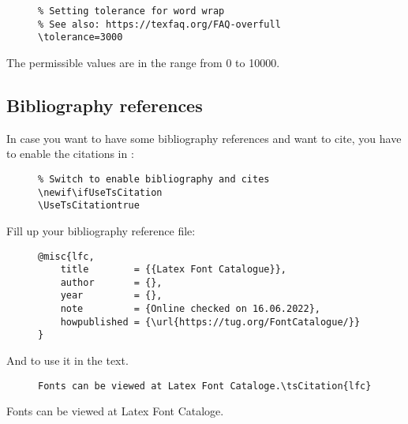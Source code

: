 \begin{figure}[H]
    \small
    \centering
    \begin{BVerbatim}
\tolerance=3000
    \end{BVerbatim}
\end{figure}

The permissible values are in the range from 0 to 10000.

\subsection{Bibliography references}\label{subsec:Bibliography references}

In case you want to have some bibliography references and want to cite, you
have to enable the citations in :

\begin{figure}[H]
    \small
    \centering
    \begin{BVerbatim}
\newif\ifUseTsCitation
\UseTsCitationtrue
    \end{BVerbatim}
\end{figure}

Fill up your bibliography reference file:

\begin{figure}[H]
    \small
    \centering
    \begin{BVerbatim}
@misc{lfc,
    title        = {{Latex Font Catalogue}},
    author       = {},
    year         = {},
    note         = {Online checked on 16.06.2022},
    howpublished = {\url{https://tug.org/FontCatalogue/}}
}
    \end{BVerbatim}
\end{figure}

And to use it in the text.

\begin{figure}[H]
    \small
    \centering
    \begin{BVerbatim}
Fonts can be viewed at Latex Font Cataloge.\tsCitation{lfc}
    \end{BVerbatim}
\end{figure}

Fonts can be viewed at Latex Font Cataloge.
